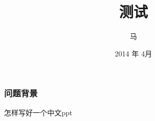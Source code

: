 \documentclass[notheorems]{beamer}
\begin{document}
\title{测试}
\author{马}
\date[April, 2014]{2014 年 4月}
\frame{\titlepage}

\begin{frame}
  \frametitle{问题背景}
  怎样写好一个中文ppt
\end{frame}
\end{document}
